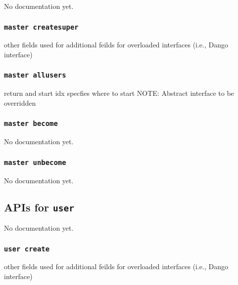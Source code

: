 No documentation yet.

\subsubsection{\lstinline[basicstyle=\Large\ttfamily]$master createsuper$}

{other fields used for additional feilds for overloaded interfaces
(i.e., Dango interface)}
\subsubsection{\lstinline[basicstyle=\Large\ttfamily]$master allusers$}

{return and start idx specfies where to start
NOTE: Abstract interface to be overridden}
\subsubsection{\lstinline[basicstyle=\Large\ttfamily]$master become$}

{No documentation yet.}
\subsubsection{\lstinline[basicstyle=\Large\ttfamily]$master unbecome$}

{No documentation yet.}
\subsection{APIs for \lstinline[basicstyle=\Large\ttfamily]$user$}

No documentation yet.

\subsubsection{\lstinline[basicstyle=\Large\ttfamily]$user create$}

{other fields used for additional feilds for overloaded interfaces
(i.e., Dango interface)}
